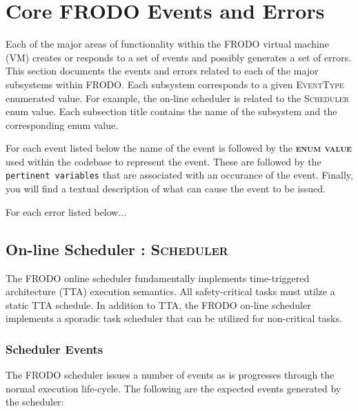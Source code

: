 \chapter{Core FRODO Events and Errors}

Each of the major areas of functionality within the FRODO virtual machine (VM) creates or responds to a set of events and possibly generates a set of errors.  This section documents the events and errors related to each of the major subsystems within FRODO.  Each subsystem corresponds to a given \textsc{EventType} enumerated value.  For example, the on-line scheduler is related to the \textsc{Scheduler} enum value.  Each subsection title contains the name of the subsystem and the corresponding enum value.

For each event listed below the name of the event is followed by the \textbf{\textsc{enum value}} used within the codebase to represent the event.  These are followed by the \texttt{pertinent variables} that are associated with an occurance of the event.  Finally, you will find a textual description of what can cause the event to be issued.

For each error listed below...


\section{On-line Scheduler : \textbf{\textsc{Scheduler}}}

The FRODO online scheduler fundamentally implements time-triggered architecture (TTA) execution semantics.  All safety-critical tasks must utilze a static TTA schedule.  In addition to TTA, the FRODO on-line scheduler implements a sporadic task scheduler that can be utilized for non-critical tasks.


\subsection{Scheduler Events}

The FRODO scheduler issues a number of events as is progresses through the normal execution life-cycle.  The following are the expected events generated by the scheduler:\\


